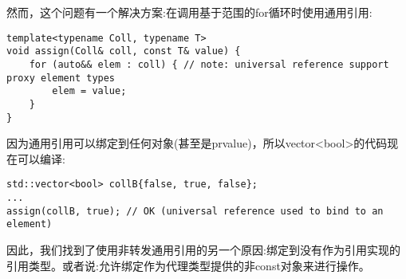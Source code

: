 然而，这个问题有一个解决方案:在调用基于范围的for循环时使用通用引用:\par

\begin{lstlisting}[caption={}]
template<typename Coll, typename T>
void assign(Coll& coll, const T& value) {
	for (auto&& elem : coll) { // note: universal reference support proxy element types
		elem = value;
	}
}
\end{lstlisting}

因为通用引用可以绑定到任何对象(甚至是prvalue)，所以vector<bool>的代码现在可以编译:\par

\begin{lstlisting}[caption={}]
std::vector<bool> collB{false, true, false};
...
assign(collB, true); // OK (universal reference used to bind to an element)
\end{lstlisting}

因此，我们找到了使用非转发通用引用的另一个原因:绑定到没有作为引用实现的引用类型。或者说:允许绑定作为代理类型提供的非const对象来进行操作。\par

































